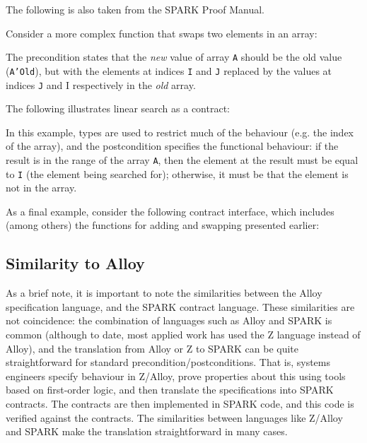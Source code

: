\begin{example}
The following is also taken from the SPARK Proof Manual.

Consider a more complex function that swaps two elements in an array:

\lstset{language=Ada}
\lstset{aboveskip=3mm}


The precondition states that the \emph{new} value of array \texttt{A} should be the old value (\texttt{A'Old}), but with the elements at indices \texttt{I} and \texttt{J} replaced by the values at indices \texttt{J} and {I} respectively in the \emph{old} array.

\end{example}

\begin{example}
The following illustrates linear search as a contract:

\lstset{language=Ada}
\lstset{aboveskip=3mm}


In this example, types are used to restrict much of the behaviour (e.g. the index of the array), and the postcondition specifies the functional behaviour: if the result is in the range of the array \texttt{A}, then the element at the result must be equal to \texttt{I} (the element being searched for); otherwise, it must be that the element is not in the array.
\end{example}

\begin{example}
As a final example, consider the following contract interface, which includes (among others) the functions for adding and swapping presented earlier:

\lstset{language=Ada}
\lstset{aboveskip=3mm}

\end{example}

\subsection{Similarity to Alloy}

As a brief note, it is important to note the similarities between the Alloy specification language, and the SPARK contract language. These similarities are not coincidence: the combination of languages such as Alloy and SPARK is common (although to date, most applied work has used the Z language instead of Alloy), and the translation from Alloy or Z to SPARK can be quite straightforward for standard precondition/postconditions. That is, systems engineers specify behaviour in Z/Alloy, prove properties about this using tools based on first-order logic, and then translate the specifications into SPARK contracts. The contracts are then implemented in SPARK code, and this code is verified against the contracts. The similarities between languages like Z/Alloy and SPARK make the translation straightforward in many cases.

